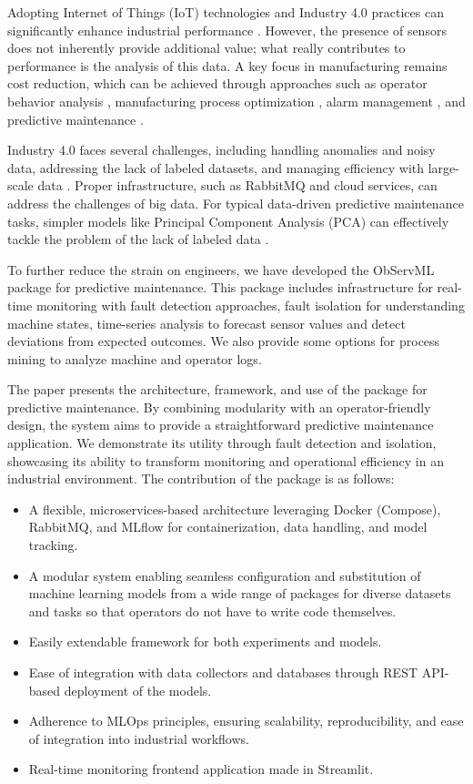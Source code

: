 \documentclass[preprint,12pt, a4paper]{elsarticle}
\begin{document}
Adopting Internet of Things (IoT) technologies and Industry 4.0 practices can significantly enhance industrial performance \citep{BUCHI2020119790}. However, the presence of sensors does not inherently provide additional value; what really contributes to performance is the analysis of this data. A key focus in manufacturing remains cost reduction, which can be achieved through approaches such as operator behavior analysis \citep{GLADYSZ2023160}, manufacturing process optimization \citep{SOORI2023100017}, alarm management \citep{alarm_management}, and predictive maintenance \citep{ZONTA2020106889}.

Industry 4.0 faces several challenges, including handling anomalies and noisy data, addressing the lack of labeled datasets, and managing efficiency with large-scale data \citep{NUNES202353}. Proper infrastructure, such as RabbitMQ and cloud services, can address the challenges of big data. For typical data-driven predictive maintenance tasks, simpler models like Principal Component Analysis (PCA) can effectively tackle the problem of the lack of labeled data \citep{NUNES202353}.

To further reduce the strain on engineers, we have developed the ObServML package for predictive maintenance. This package includes infrastructure for real-time monitoring with fault detection approaches, fault isolation for understanding machine states, time-series analysis to forecast sensor values and detect deviations from expected outcomes. We also provide some options for process mining to analyze machine and operator logs. 


The paper presents the architecture, framework, and use of the package for predictive maintenance. By combining modularity with an operator-friendly design, the system aims to provide a straightforward predictive maintenance application. We demonstrate its utility through fault detection and isolation, showcasing its ability to transform monitoring and operational efficiency in an industrial environment. The contribution of the package is as follows:
\begin{itemize}
\item A flexible, microservices-based architecture leveraging Docker (Compose), RabbitMQ, and MLflow for containerization, data handling, and model tracking.
\item A modular system enabling seamless configuration and substitution of machine learning models from a wide range of packages for diverse datasets and tasks so that operators do not have to write code themselves.
\item Easily extendable framework for both experiments and models.
\item Ease of integration with data collectors and databases through REST API-based deployment of the models.
\item Adherence to MLOps principles, ensuring scalability, reproducibility, and ease of integration into industrial workflows.
\item Real-time monitoring frontend application made in Streamlit.
\end{itemize}
\end{document}
